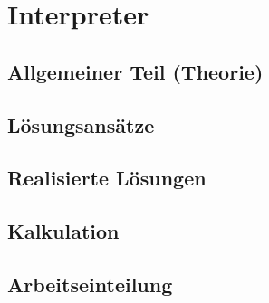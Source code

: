 

\chapter{Interpreter}


\section{Allgemeiner Teil (Theorie)}


\section{Lösungsansätze}

\section{Realisierte Lösungen}

\section{Kalkulation}

\section{Arbeitseinteilung}